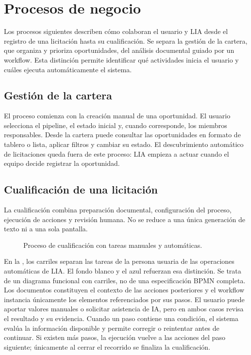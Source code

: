 \section{Procesos de negocio}

Los procesos siguientes describen cómo colaboran el usuario y LIA desde el
registro de una licitación hasta su cualificación. Se separa la gestión de la
cartera, que organiza y prioriza oportunidades, del análisis documental guiado
por un workflow. Esta distinción permite identificar qué actividades inicia el
usuario y cuáles ejecuta automáticamente el sistema.

\subsection{Gestión de la cartera}

El proceso comienza con la creación manual de una oportunidad. El usuario
selecciona el pipeline, el estado inicial y, cuando corresponde, los miembros
responsables. Desde la cartera puede consultar las oportunidades en formato de
tablero o lista, aplicar filtros y cambiar su estado. El descubrimiento
automático de licitaciones queda fuera de este proceso: LIA empieza a actuar
cuando el equipo decide registrar la oportunidad.

\subsection{Cualificación de una licitación}

La cualificación combina preparación documental, configuración del proceso,
ejecución de acciones y revisión humana. No se reduce a una única generación
de texto ni a una sola pantalla.

\begin{figure}[H]
  \centering
  \resizebox{\textwidth}{!}{
    
  }
  \caption{Proceso de cualificación con tareas manuales y automáticas.}
  \label{fig:qualification-process}
\end{figure}

En la , los carriles separan las tareas de la
persona usuaria de las operaciones automáticas de LIA. El fondo blanco y el
azul refuerzan esa distinción. Se trata de un diagrama funcional con carriles,
no de una especificación BPMN completa. Los documentos
constituyen el contexto de las acciones posteriores y el workflow instancia
únicamente los elementos referenciados por sus pasos. El usuario puede aportar
valores manuales o solicitar asistencia de IA, pero en ambos casos revisa el
resultado y su evidencia. Cuando un paso contiene una condición, el sistema
evalúa la información disponible y permite corregir o reintentar antes de
continuar. Si existen más pasos, la ejecución vuelve a las acciones del paso
siguiente; únicamente al cerrar el recorrido se finaliza la cualificación.

